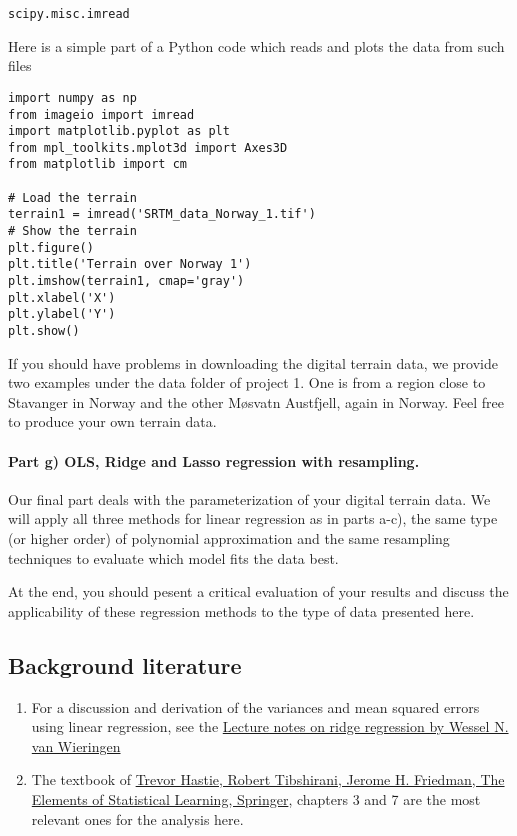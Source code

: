 \documentclass[%
oneside,                 %
final,                   %
10pt]{article}
\begin{document}
\begin{verbatim}
scipy.misc.imread
\end{verbatim}

Here is a simple part of a Python code which reads and plots the data
from such files

\begin{verbatim}
import numpy as np
from imageio import imread
import matplotlib.pyplot as plt
from mpl_toolkits.mplot3d import Axes3D
from matplotlib import cm

# Load the terrain
terrain1 = imread('SRTM_data_Norway_1.tif')
# Show the terrain
plt.figure()
plt.title('Terrain over Norway 1')
plt.imshow(terrain1, cmap='gray')
plt.xlabel('X')
plt.ylabel('Y')
plt.show()
\end{verbatim}

If you should have problems in downloading the digital terrain data,
we provide two examples under the data folder of project 1. One is
from a region close to Stavanger in Norway and the other Møsvatn
Austfjell, again in Norway.
Feel free to produce your own terrain data.

\paragraph{Part g) OLS, Ridge and Lasso regression with resampling.}
Our final part deals with the parameterization of your digital terrain
data.  We will apply all three methods for linear regression as in
parts a-c), the same type (or higher order) of polynomial
approximation and the same resampling techniques to evaluate which
model fits the data best.

At the end, you should pesent a critical evaluation of your results
and discuss the applicability of these regression methods to the type
of data presented here.




\subsection*{Background literature}

\begin{enumerate}
\item For a discussion and derivation of the variances and mean squared errors using linear regression, see the \href{{https://arxiv.org/abs/1509.09169}}{Lecture notes on ridge regression by Wessel N. van Wieringen}

\item The textbook of \href{{https://www.springer.com/gp/book/9780387848570}}{Trevor Hastie, Robert Tibshirani, Jerome H. Friedman, The Elements of Statistical Learning, Springer}, chapters 3 and 7 are the most relevant ones for the analysis here. 
\end{enumerate}
\end{document}
